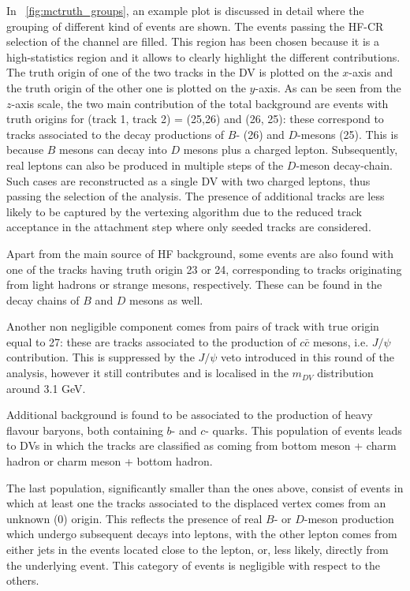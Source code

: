 In ~\cref{fig:mctruth_groups}, an example plot is discussed in detail where the grouping of different kind of events are shown. The events passing the HF-CR selection of the \uuu channel are filled. This region has been chosen because it is a high-statistics region and it allows to clearly highlight the different contributions. The truth origin of one of the two tracks in the DV is plotted on the $x$-axis and the truth origin of the other one is plotted on the $y$-axis. As can be seen from the $z$-axis scale, the two main contribution of the total background are events with truth origins for (track 1, track 2) = (25,26) and (26, 25): these correspond to tracks associated to the decay productions of $B$- (26) and $D$-mesons (25). This is because $B$ mesons can decay into $D$ mesons plus a charged lepton. Subsequently, real leptons can also be produced in multiple steps of the $D$-meson decay-chain. Such cases are reconstructed as a single DV with two charged leptons, thus passing the selection of the analysis. The presence of additional tracks are less likely to be captured by the vertexing algorithm due to the reduced track acceptance in the attachment step where only seeded tracks are considered.

Apart from the main source of HF background, some events are also found with one of the tracks having truth origin 23 or 24, corresponding to tracks originating from light hadrons or strange mesons, respectively. These can be found in the decay chains of $B$ and $D$ mesons as well. 

Another non negligible component comes from pairs of track with true origin equal to 27: these are tracks associated to the production of $c\bar{c}$ mesons, i.e. $J/\psi$ contribution. This is suppressed by the $J/\psi$ veto introduced in this round of the analysis, however it still contributes and is localised in the $m_{DV}$ distribution around 3.1 GeV.

Additional background is found to be associated to the production of heavy flavour baryons, both containing $b$- and $c$- quarks. This population of events leads to DVs in which the tracks are classified as coming from bottom meson + charm hadron or charm meson + bottom hadron. 

The last population, significantly smaller than the ones above, consist of events in which at least one the tracks associated to the displaced vertex comes from an unknown (0) origin. This reflects the presence of real $B$- or $D$-meson production which undergo subsequent decays into leptons, with the other lepton comes from either jets in the events located close to the lepton, or, less likely, directly from the underlying event. This category of events is negligible with respect to the others.

